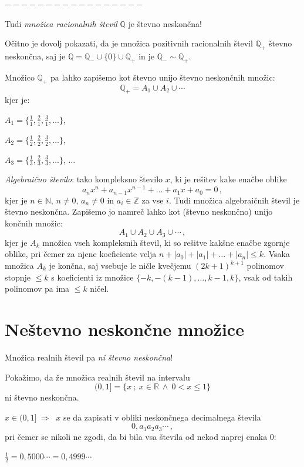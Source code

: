 \documentclass[11pt,paper=b5,footinclude,headinclude]{scrbook} %
\def\inn {{~\wedge~}}
\def\sledi {{~\Rightarrow~}}
\begin{document}
\bigskip
$-----------------$
\bigskip

Tudi {\em množica racionalnih števil} $\mathbb{Q}$ je števno neskončna!

Očitno je dovolj pokazati, da je množica pozitivnih racionalnih števil $\mathbb{Q}_+$
 števno neskončna, saj je $\mathbb{Q} = \mathbb{Q}_-\cup \{0\}\cup \mathbb{Q}_+$ in je
$\mathbb{Q}_-\sim \mathbb{Q}_+$.

Množico $\mathbb{Q}_+$ pa lahko zapišemo kot števno unijo števno neskončnih množic:
$$\mathbb{Q}_+ = A_1\cup A_2\cup \cdots$$
kjer je:

$A_1 = \{\frac{1}{1}, \frac{2}{1}, \frac{3}{1}, \ldots\}$,

$A_2 = \{\frac{1}{2}, \frac{2}{2}, \frac{3}{2}, \ldots\}$,

$A_3 = \{\frac{1}{3}, \frac{2}{3}, \frac{3}{3}, \ldots\}$, $\ldots$


{\em Algebraično število}: tako kompleksno število $x$, ki je rešitev kake enačbe oblike
$$a_nx^n+a_{n-1}x^{n-1}+\ldots+a_1x+a_0 = 0\,,$$
kjer je $n\in \mathbb{N}$, $n\neq 0$, $a_n\neq 0$ in $a_i\in \mathbb{Z}$ za vse $i$.
Tudi množica algebraičnih števil je števno neskončna. Zapišemo jo namreč lahko kot
(števno neskončno) unijo končnih množic:
$$A_1\cup A_2\cup A_3\cup \cdots\,,$$
kjer je $A_k$ množica vseh kompleksnih števil, ki so rešitve
kakšne enačbe zgornje oblike, pri čemer za njene koeficiente velja
$n+|a_0|+|a_1|+\ldots+|a_n|\le k$.
Vsaka množica $A_k$ je končna, saj vsebuje le ničle kvečjemu
$(2k+1)^{k+1}$ polinomov stopnje $\le k$ s koeficienti iz množice $\{-k,-(k-1), \ldots, k-1,k\}$, vsak od takih polinomov pa ima
$\le k$ ničel.


\section{Neštevno neskončne množice}

Množica realnih števil pa {\em ni števno neskončna}!

Pokažimo, da že množica realnih števil na intervalu $$(0,1] = \{x~;~x\in \mathbb{R}\inn 0<x\le 1\}$$
ni števno neskončna.

$x\in (0,1]\sledi$ $x$ se da zapisati v obliki neskončnega decimalnega števila
$$0,a_1a_2a_3\cdots\,,$$
pri čemer se nikoli ne zgodi, da bi bila vsa števila od nekod naprej enaka 0:

$\frac{1}{2} = 0,5000\cdots = 0,4999\cdots$
\end{document}
